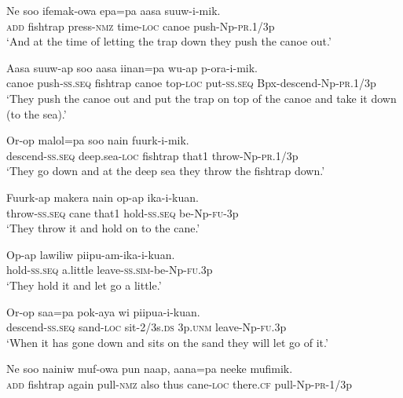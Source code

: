 \ea
\gll  Ne  soo  ifemak-owa  epa=pa  aasa  suuw-i-mik. \\
\textsc{add}  fishtrap  press-\textsc{nmz}  time-\textsc{loc}  canoe  push{}-Np-\textsc{pr}.1/3p \\
\glt ‘And at the time of letting the trap down they push the canoe out.’ \\
\z


\ea
\gll  Aasa  suuw-ap  soo  aasa  iinan=pa  wu-ap           p-ora-i-mik. \\
canoe  push-\textsc{ss.seq}  fishtrap  canoe  top-\textsc{loc}  put-\textsc{ss.seq}  Bpx-descend-Np-\textsc{pr}.1/3p \\


\glt ‘They push the canoe out and put the trap on top of the canoe and take it down (to the sea).’ \\
\z


\ea
\gll  Or-op  malol=pa  soo  nain  fuurk-i-mik. \\
descend-\textsc{ss.seq}  deep.sea-\textsc{loc}  fishtrap  that1  throw{}-Np-\textsc{pr}.1/3p \\
\glt ‘They go down and at the deep sea they throw the fishtrap down.’ \\
\z


\ea
\gll  Fuurk-ap  makera  nain  op-ap  ika-i-kuan. \\
throw-\textsc{ss.seq}  cane  that1  hold-\textsc{ss.seq}  be-Np-\textsc{fu}-3p \\
\glt ‘They throw it and hold on to the cane.’ \\
\z


\ea
\gll  Op-ap  lawiliw  piipu-am-ika-i-kuan. \\
hold-\textsc{ss.seq}  a.little  leave-\textsc{ss}.\textsc{sim}-be-Np-\textsc{fu}.3p \\
\glt ‘They hold it and let go a little.’ \\
\z


\ea
\gll  Or-op  saa=pa  pok-aya  wi  piipua-i-kuan. \\
descend-\textsc{ss.seq}  sand-\textsc{loc}  sit-2/3s.\textsc{ds}  3p.\textsc{unm}  leave-Np-\textsc{fu}.3p \\
\glt ‘When it has gone down and sits on the sand they will let go of it.’ \\
\z


\ea
\gll  Ne  soo  nainiw  muf-owa  pun  naap,  aana=pa  neeke  mufimik. \\
\textsc{add}  fishtrap  again  pull-\textsc{nmz}  also  thus  cane-\textsc{loc}  there.\textsc{cf}  pull-Np-\textsc{pr}-1/3p \\


